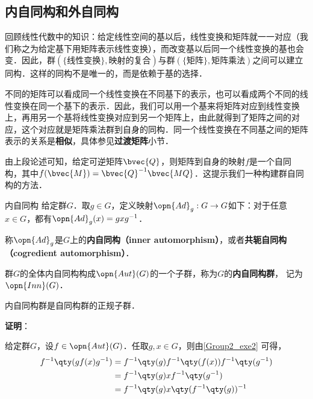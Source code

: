 \subsection{内自同构和外自同构}



回顾线性代数中的知识：给定线性空间的基以后，线性变换和矩阵就一一对应（我们称之为给定基下用矩阵表示线性变换），而改变基以后同一个线性变换的基也会变．因此，群$(\{\text{线性变换}\}, \text{映射的复合})$与群$(\{\text{矩阵}\}, \text{矩阵乘法})$之间可以建立同构．这样的同构不是唯一的，而是依赖于基的选择．

不同的矩阵可以看成同一个线性变换在不同基下的表示，也可以看成两个不同的线性变换在同一个基下的表示．因此，我们可以用一个基来将矩阵对应到线性变换上，再用另一个基将线性变换对应到另一个矩阵上，由此就得到了矩阵之间的对应，这个对应就是矩阵乘法群到自身的同构．同一个线性变换在不同基之间的矩阵表示的关系是\textbf{相似}，具体参见\textbf{过渡矩阵}小节．

由上段论述可知，给定可逆矩阵$\bvec{Q}$，则矩阵到自身的映射$f$是一个自同构，其中$f(\bvec{M})=\bvec{Q}^{-1}\bvec{MQ}$．这提示我们一种构建群自同构的方法．

\begin{definition}{内自同构}
给定群$G$．取$g\in G$，定义映射$\opn{Ad}_g:G\to G$如下：对于任意$x\in G$，都有$\opn{Ad}_g(x)=gxg^{-1}$．

称$\opn{Ad}_g$是$G$上的\textbf{内自同构（inner automorphism）}，或者\textbf{共轭自同构（cogredient automorphism）}．


群$G$的全体内自同构构成$\opn{Aut}(G)$的一个子群，称为$G$的\textbf{内自同构群}， 记为$\opn{Inn}(G)$．

\end{definition}

\begin{theorem}{}\label{Group2_the1}
内自同构群是自同构群的正规子群．
\end{theorem}

\textbf{证明}：

给定群$G$，设$f\in \opn{Aut}(G)$．任取$g, x\in G$，则由\autoref{Group2_exe2} 可得，
\begin{equation}\label{Group2_eq1}
\begin{aligned}
f^{-1}\qty(gf(x)g^{-1})&=f^{-1}\qty(g)f^{-1}\qty(f(x))f^{-1}\qty(g^{-1})\\
&=f^{-1}\qty(g)xf^{-1}\qty(g^{-1})\\
&=f^{-1}\qty(g)x\qty(f^{-1}\qty(g))^{-1}
\end{aligned}
\end{equation}

